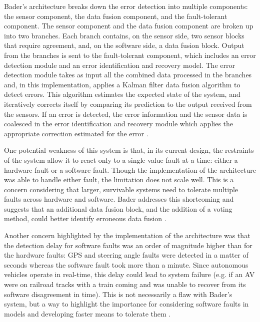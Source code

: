 \documentclass[twoside, conference]{IEEEtran}%
\begin{document}
Bader's architecture breaks down the error detection into multiple components: the sensor component, the data fusion component, and the fault-tolerant component. The sensor component and the data fusion component are broken up into two branches. Each branch contains, on the sensor side, two sensor blocks that require agreement, and, on the software side, a data fusion block. Output from the branches is sent to the fault-tolerant component, which includes an error detection module and an error identification and recovery model. The error detection module takes as input all the combined data processed in the branches and, in this implementation, applies a Kalman filter data fusion algorithm to detect errors. This algorithm estimates the expected state of the system, and iteratively corrects itself by comparing its prediction to the output received from the sensors. If an error is detected, the error information and the sensor data is coalesced in the error identification and recovery module which applies the appropriate correction estimated for the error \cite{Bader2014}.

One potential weakness of this system is that, in its current design, the restraints of the system allow it to react only to a single value fault at a time: either a hardware fault or a software fault. Though the implementation of the architecture was able to handle either fault, the limitation does not scale well. This is a concern considering that larger, survivable systems need to tolerate multiple faults across hardware and software. Bader addresses this shortcoming and suggests that an additional data fusion block, and the addition of a voting method, could better identify erroneous data fusion \cite{Bader2014}.

Another concern highlighted by the implementation of the architecture was that the detection delay for software faults was an order of magnitude higher than for the hardware faults: GPS and steering angle faults were detected in a matter of seconds whereas the software fault took more than a minute. Since autonomous vehicles operate in real-time, this delay could lead to system failure (e.g. if an AV were on railroad tracks with a train coming and was unable to recover from its software disagreement in time). This is not necessarily a flaw with Bader's system, but a way to highlight the importance for considering software faults in models and developing faster means to tolerate them \cite{Bader2014}.
\end{document}
